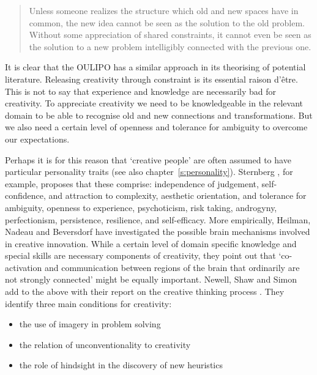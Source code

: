 \begin{quotation}
  Unless someone realizes the structure which old and new spaces have in common, the new idea cannot be seen as the solution to the old problem. Without some appreciation of shared constraints, it cannot even be seen as the solution to a new problem intelligibly connected with the previous one. 
\end{quotation}

It is clear that the \ac{OULIPO} has a similar approach in its theorising of potential literature. Releasing creativity through constraint is its essential raison d'être. This is not to say that experience and knowledge are necessarily bad for creativity. To appreciate creativity we need to be knowledgeable in the relevant domain to be able to recognise old and new connections and transformations. But we also need a certain level of openness and tolerance for ambiguity to overcome our expectations.

Perhaps it is for this reason that `creative people' are often assumed to have particular personality traits (see also chapter~\ref{s:personality}). Sternberg \autocite*{Sternberg1999}, for example, proposes that these comprise: independence of judgement, self-confidence, and attraction to complexity, aesthetic orientation, and tolerance for ambiguity, openness to experience, psychoticism, risk taking, androgyny, perfectionism, persistence, resilience, and self-efficacy. More empirically, Heilman, Nadeau and Beversdorf \autocite*{Heilman2003} have investigated the possible brain mechanisms involved in creative innovation. While a certain level of domain specific knowledge and special skills are necessary components of creativity, they point out that `co-activation and communication between regions of the brain that ordinarily are not strongly connected' might be equally important. Newell, Shaw and Simon add to the above with their report on the creative thinking process \autocite*{Newell1963}. They identify three main conditions for creativity:

\begin{itemize}
  \item the use of imagery in problem solving
  \item the relation of unconventionality to creativity
  \item the role of hindsight in the discovery of new heuristics
\end{itemize}


